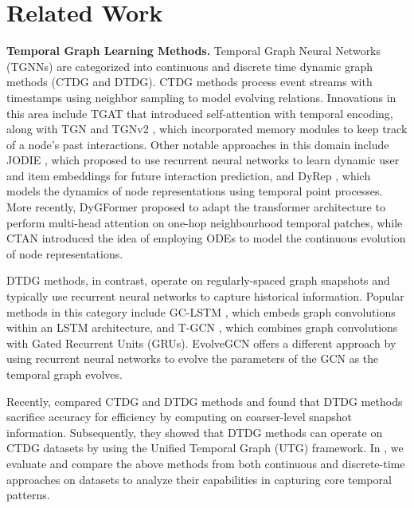 
\section{Related Work}

\textbf{Temporal Graph Learning Methods.}
Temporal Graph Neural Networks (TGNNs) are categorized into continuous and discrete time dynamic graph methods (CTDG and DTDG). CTDG methods process event streams with timestamps using neighbor sampling to model evolving relations. Innovations in this area include TGAT \citep{tgat} that introduced self-attention with temporal encoding, along with TGN \cite{tgn} and TGNv2 \cite{tjandra2024enhancingexpressivitytemporalgraph}, which incorporated memory modules to keep track of a node's past interactions. Other notable approaches in this domain include JODIE \citep{Jodie_Kumar_2019}, which proposed to use recurrent neural networks to learn dynamic user and item embeddings for future interaction prediction, and DyRep \citep{dyrep}, which models the dynamics of node representations using temporal point processes. More recently, DyGFormer \citep{dygformer} proposed to adapt the transformer architecture to perform multi-head attention on one-hop neighbourhood temporal patches, while CTAN \cite{ctan} introduced the idea of employing ODEs to model the continuous evolution of node representations.

DTDG methods, in contrast, operate on regularly-spaced graph snapshots and typically use recurrent neural networks to capture historical information. Popular methods in this category include GC-LSTM \citep{gclstm}, which embeds graph convolutions \cite{gcn} within an LSTM architecture, and T-GCN \citep{tgcn}, which combines graph convolutions with Gated Recurrent Units (GRUs). EvolveGCN \citep{evolvegcn} offers a different approach by using recurrent neural networks to evolve the parameters of the GCN as the temporal graph evolves.

Recently, \cite{huangutg} compared CTDG and DTDG methods and found that DTDG methods sacrifice accuracy for efficiency by computing on coarser-level snapshot information. Subsequently, they showed that DTDG methods can operate on CTDG datasets by using the Unified Temporal Graph (UTG) framework. In , we evaluate and compare the above methods from both continuous and discrete-time approaches on \benchmarkname datasets to analyze their capabilities in capturing core temporal patterns. 

